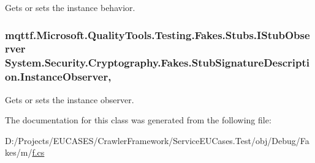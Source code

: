 Gets or sets the instance behavior.

\hypertarget{class_system_1_1_security_1_1_cryptography_1_1_fakes_1_1_stub_signature_description_a70c27ecac5633aad37ed04fd68ae6d9f}{
\subsubsection[{Instance\-Observer}]{\setlength{\rightskip}{0pt plus 5cm}mqttf.\-Microsoft.\-Quality\-Tools.\-Testing.\-Fakes.\-Stubs.\-I\-Stub\-Observer System.\-Security.\-Cryptography.\-Fakes.\-Stub\-Signature\-Description.\-Instance\-Observer\hspace{0.3cm}{\ttfamily [get]}, {\ttfamily [set]}}}\label{class_system_1_1_security_1_1_cryptography_1_1_fakes_1_1_stub_signature_description_a70c27ecac5633aad37ed04fd68ae6d9f}


Gets or sets the instance observer.



The documentation for this class was generated from the following file\-:\begin{DoxyCompactItemize}
\item 
D\-:/\-Projects/\-E\-U\-C\-A\-S\-E\-S/\-Crawler\-Framework/\-Service\-E\-U\-Cases.\-Test/obj/\-Debug/\-Fakes/m/\hyperlink{m_2f_8cs}{f.\-cs}\end{DoxyCompactItemize}
